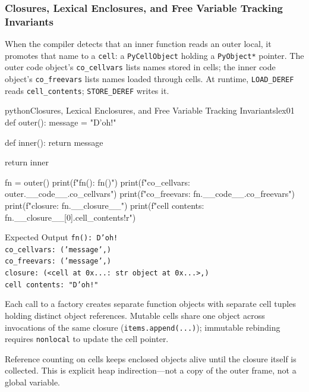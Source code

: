 \documentclass[a4paper,twoside]{report}
\begin{document}
\subsubsection{Closures, Lexical Enclosures, and Free Variable Tracking Invariants}

When the compiler detects that an inner function reads an outer local, it promotes that name to a \texttt{cell}: a \texttt{PyCellObject} holding a \texttt{PyObject*} pointer. The outer code object's \texttt{co\_cellvars} lists names stored in cells; the inner code object's \texttt{co\_freevars} lists names loaded through cells. At runtime, \texttt{LOAD\_DEREF} reads \texttt{cell\_contents}; \texttt{STORE\_DEREF} writes it.

\begin{codebox}[]{python}{Closures, Lexical Enclosures, and Free Variable Tracking Invariants}{lex01}
def outer():
    message = "D'oh!"

    def inner():
        return message

    return inner

fn = outer()
print(f"fn(): {fn()}")
print(f"co_cellvars: {outer.__code__.co_cellvars}")
print(f"co_freevars: {fn.__code__.co_freevars}")
print(f"closure: {fn.__closure__}")
print(f"cell contents: {fn.__closure__[0].cell_contents!r}")
\end{codebox}


\begin{iobox}{Expected Output}
\texttt{fn(): D'oh!} \\
\texttt{co\_cellvars: ('message',)} \\
\texttt{co\_freevars: ('message',)} \\
\texttt{closure: (<cell at 0x...: str object at 0x...>,)} \\
\texttt{cell contents: "D'oh!"} \\
\end{iobox}




Each call to a factory creates separate function objects with separate cell tuples holding distinct object references. Mutable cells share one object across invocations of the same closure (\texttt{items.append(...)}); immutable rebinding requires \texttt{nonlocal} to update the cell pointer.

Reference counting on cells keeps enclosed objects alive until the closure itself is collected. This is explicit heap indirection---not a copy of the outer frame, not a global variable.
\end{document}

